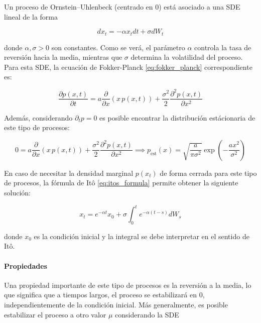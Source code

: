Un proceso de Ornstein–Uhlenbeck (centrado en 0) está asociado a una SDE lineal de la forma

\begin{equation}
    dx_t = -\alpha x_t dt + \sigma dW_t
    \label{eq:ou_process}
\end{equation}

donde $\alpha, \sigma > 0$ son constantes. Como se verá, el parámetro $\alpha$ controla la tasa de reversión hacia la media, mientras que $\sigma$ determina la volatilidad del proceso. Para esta SDE, la ecuación de Fokker-Planck \eqref{eq:fokker_planck} correspondiente es:

\begin{equation}
    \frac{\partial p(x,t)}{\partial t} = a\frac{\partial}{\partial x} (x\, p(x, t)) + \frac{\sigma^2}{2} \frac{\partial^{2}p(x, t)}{\partial x^2}
\end{equation}

Además, considerando $\partial_{t}p=0$ es posible encontrar la distribución estácionaria de este tipo de procesos:

\begin{equation}
    \label{eq:ou_stationary}
    0 = a\frac{\partial}{\partial x} (x\, p(x, t)) + \frac{\sigma^2}{2} \frac{\partial^{2}p(x, t)}{\partial x^2}
\implies
p_{\operatorname{est}}(x) = \sqrt{\frac{a}{\pi\sigma^{2}}}\exp\left(-\frac{ax^2}{\sigma^2}\right)
\end{equation}

En caso de necesitar la densidad marginal $p(x_t)$ de forma cerrada para este tipo de procesos, la fórmula de Itô \eqref{eq:itos_formula} permite obtener la siguiente solución:

\begin{equation}
    \label{eq:ou_solution}
    x_t = e^{-\alpha t} x_0 + \sigma \int_0^t e^{-\alpha(t-s)} dW_s
\end{equation}

donde $x_0$ es la condición inicial y la integral se debe interpretar en el sentido de Itô.

\paragraph{Propiedades}

Una propiedad importante de este tipo de procesos es la reversión a la media, lo que significa que a tiempos largos, el proceso se estabilizará en 0, independientemente de la condición inicial. Más generalmente, es posible estabilizar el proceso a otro valor $\mu$ considerando la SDE

